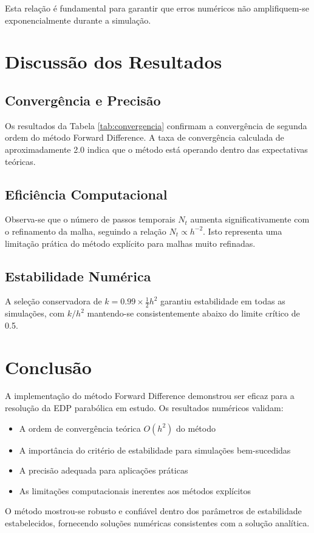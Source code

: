 \documentclass[a4paper, 12pt]{article}
\begin{document}
    Esta relação é fundamental para garantir que erros numéricos não amplifiquem-se exponencialmente durante a simulação.


    \section{Discussão dos Resultados}

    \subsection{Convergência e Precisão}

    Os resultados da Tabela \ref{tab:convergencia} confirmam a convergência de segunda ordem do método Forward Difference. A taxa de convergência calculada de aproximadamente 2.0 indica que o método está operando dentro das expectativas teóricas.

    \subsection{Eficiência Computacional}

    Observa-se que o número de passos temporais $N_t$ aumenta significativamente com o refinamento da malha, seguindo a relação $N_t \propto h^{-2}$. Isto representa uma limitação prática do método explícito para malhas muito refinadas.

    \subsection{Estabilidade Numérica}

    A seleção conservadora de $k = 0.99 \times \frac{1}{2}h^2$ garantiu estabilidade em todas as simulações, com $k/h^2$ mantendo-se consistentemente abaixo do limite crítico de 0.5.


    \section{Conclusão}

    A implementação do método Forward Difference demonstrou ser eficaz para a resolução da EDP parabólica em estudo. Os resultados numéricos validam:

    \begin{itemize}
        \item A ordem de convergência teórica $O(h^2)$ do método
        \item A importância do critério de estabilidade para simulações bem-sucedidas
        \item A precisão adequada para aplicações práticas
        \item As limitações computacionais inerentes aos métodos explícitos
    \end{itemize}

    O método mostrou-se robusto e confiável dentro dos parâmetros de estabilidade estabelecidos, fornecendo soluções numéricas consistentes com a solução analítica.
\end{document}
